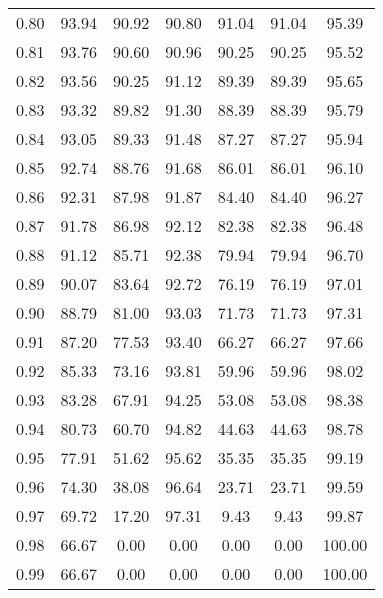 \begin{tabular}{|c|c|c|c|c|c|c|}
      0.80 &     93.94 &     90.92 &      90.80 &   91.04 &      91.04 &         95.39 \\
      0.81 &     93.76 &     90.60 &      90.96 &   90.25 &      90.25 &         95.52 \\
      0.82 &     93.56 &     90.25 &      91.12 &   89.39 &      89.39 &         95.65 \\
      0.83 &     93.32 &     89.82 &      91.30 &   88.39 &      88.39 &         95.79 \\
      0.84 &     93.05 &     89.33 &      91.48 &   87.27 &      87.27 &         95.94 \\
      0.85 &     92.74 &     88.76 &      91.68 &   86.01 &      86.01 &         96.10 \\
      0.86 &     92.31 &     87.98 &      91.87 &   84.40 &      84.40 &         96.27 \\
      0.87 &     91.78 &     86.98 &      92.12 &   82.38 &      82.38 &         96.48 \\
      0.88 &     91.12 &     85.71 &      92.38 &   79.94 &      79.94 &         96.70 \\
      0.89 &     90.07 &     83.64 &      92.72 &   76.19 &      76.19 &         97.01 \\
      0.90 &     88.79 &     81.00 &      93.03 &   71.73 &      71.73 &         97.31 \\
      0.91 &     87.20 &     77.53 &      93.40 &   66.27 &      66.27 &         97.66 \\
      0.92 &     85.33 &     73.16 &      93.81 &   59.96 &      59.96 &         98.02 \\
      0.93 &     83.28 &     67.91 &      94.25 &   53.08 &      53.08 &         98.38 \\
      0.94 &     80.73 &     60.70 &      94.82 &   44.63 &      44.63 &         98.78 \\
      0.95 &     77.91 &     51.62 &      95.62 &   35.35 &      35.35 &         99.19 \\
      0.96 &     74.30 &     38.08 &      96.64 &   23.71 &      23.71 &         99.59 \\
      0.97 &     69.72 &     17.20 &      97.31 &    9.43 &       9.43 &         99.87 \\
      0.98 &     66.67 &      0.00 &       0.00 &    0.00 &       0.00 &        100.00 \\
      0.99 &     66.67 &      0.00 &       0.00 &    0.00 &       0.00 &        100.00 \\
\bottomrule
\end{tabular}
